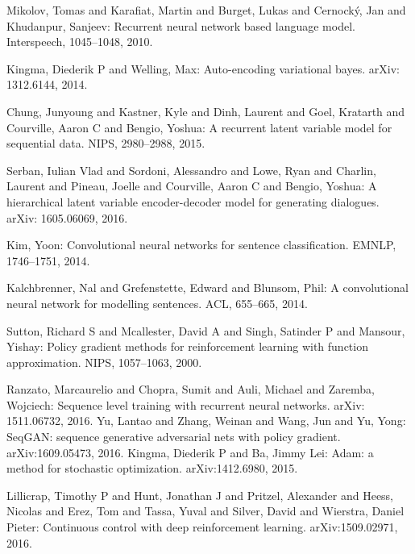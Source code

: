 \documentclass{llncs}
\begin{document}
\renewcommand\refname{References}
\begin{thebibliography}{99}

 Mikolov, Tomas and Karafiat, Martin and Burget, Lukas and Cernocký, Jan and Khudanpur, Sanjeev: Recurrent neural network 
based language model. Interspeech, 1045--1048, 2010.

 Kingma, Diederik P and Welling, Max: Auto-encoding variational bayes. arXiv: 1312.6144, 2014.

 Chung, Junyoung and Kastner, Kyle and Dinh, Laurent and Goel, Kratarth and Courville, Aaron C and Bengio, Yoshua: A recurrent latent variable model for sequential data. NIPS, 2980--2988, 2015.

 Serban, Iulian Vlad and Sordoni, Alessandro and Lowe, Ryan and Charlin, Laurent and Pineau, Joelle and Courville, Aaron C and Bengio, Yoshua: A hierarchical latent variable encoder-decoder model for generating dialogues. arXiv: 1605.06069, 2016.

  Kim, Yoon: Convolutional neural networks for sentence classification. EMNLP, 1746--1751, 2014.

 Kalchbrenner, Nal and Grefenstette, Edward and Blunsom, Phil: A convolutional neural network for modelling sentences. ACL, 655--665, 2014.

Sutton, Richard S and Mcallester, David A and Singh, Satinder P and Mansour, Yishay: Policy gradient methods for reinforcement learning with function approximation. NIPS, 1057--1063, 2000.

 Ranzato, Marcaurelio and Chopra, Sumit and Auli, Michael and Zaremba, Wojciech: Sequence level training with recurrent neural networks.
arXiv: 1511.06732, 2016.
 Yu, Lantao and Zhang, Weinan and Wang, Jun and Yu, Yong: SeqGAN: sequence generative adversarial nets with policy gradient. 
arXiv:1609.05473, 2016.
 Kingma, Diederik P and Ba, Jimmy Lei: Adam: a method for stochastic optimization. arXiv:1412.6980, 2015.

 Lillicrap, Timothy P and Hunt, Jonathan J and Pritzel, Alexander and Heess, Nicolas and Erez, Tom and Tassa, Yuval and Silver, David and Wierstra, Daniel Pieter: Continuous control with deep reinforcement learning. arXiv:1509.02971, 2016.



\end{thebibliography}
\end{document}
